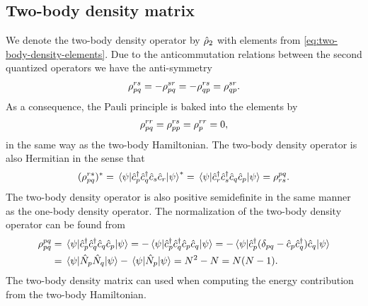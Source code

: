         \subsection{Two-body density matrix}
            We denote the two-body density operator by $\hat{\rho}_2$ with
            elements from \autoref{eq:two-body-density-elements}.
            Due to the anticommutation relations between the second quantized
            operators we have the anti-symmetry
            \begin{align}
                \rho^{rs}_{pq}
                = -\rho^{sr}_{pq}
                = -\rho^{rs}_{qp}
                = \rho^{sr}_{qp}.
            \end{align}
            As a consequence, the Pauli principle is baked into the elements by
            \begin{align}
                \rho^{rr}_{pq}
                = \rho^{rs}_{pp}
                = \rho^{rr}_{p}
                = 0,
            \end{align}
            in the same way as the two-body Hamiltonian.
            The two-body density operator is also Hermitian in the sense that
            \begin{align}
                (\rho^{rs}_{pq})^{*}
                = \mel{\psi}{\hat{c}_{p}^{\dagger}\hat{c}_{q}^{\dagger}\hat{c}_{s}\hat{c}_{r}}{\psi}^{*}
                = \mel{\psi}{\hat{c}_{r}^{\dagger}\hat{c}_{s}^{\dagger}\hat{c}_{q}\hat{c}_{p}}{\psi}
                = \rho^{pq}_{rs}.
            \end{align}
            The two-body density operator is also positive semidefinite in the
            same manner as the one-body density operator.
            The normalization of the two-body density operator can be found from
            \begin{align}
                \rho^{pq}_{pq}
                &= \mel{\psi}{\hat{c}_{p}^{\dagger}\hat{c}_{q}^{\dagger}\hat{c}_{q}\hat{c}_{p}}{\psi}
                = -\mel{\psi}{\hat{c}_{p}^{\dagger}\hat{c}_{q}^{\dagger}\hat{c}_{p}\hat{c}_{q}}{\psi}
                = -\mel{\psi}{
                    \hat{c}_{p}^{\dagger}(\delta_{pq} - \hat{c}_{p}\hat{c}_{q}^{\dagger})\hat{c}_{q}
                }{\psi}
                \\
                &=
                \mel{\psi}{\hat{N}_{p}\hat{N}_{q}}{\psi}
                - \mel{\psi}{\hat{N}_{p}}{\psi}
                = N^2 - N
                = N(N - 1).
            \end{align}
            The two-body density matrix can used when computing the energy
            contribution from the two-body Hamiltonian.

